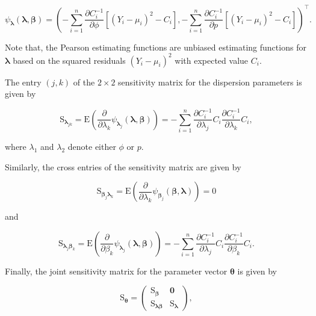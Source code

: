 \documentclass[9pt,a5paper,]{book}
\theoremstyle{definition}
\theoremstyle{definition}
\theoremstyle{remark}
\begin{document}
\begin{equation*}
\label{Pearson}
\psi_{\boldsymbol{\lambda}}(\boldsymbol{\lambda}, \boldsymbol{\beta}) = \left (-\sum_{i=1}^n \frac{\partial C^{-1}_i}{\partial \phi} \left [ (Y_i - \mu_i)^2 - C_i \right ], -\sum_{i=1}^n \frac{\partial C^{-1}_i}{\partial p}  \left [ (Y_i - \mu_i)^2 - C_i \right ]  \right )^\top.
\end{equation*}

Note that, the Pearson estimating functions are unbiased estimating
functions for \(\boldsymbol{\lambda}\) based on the squared residuals
\((Y_i - \mu_i)^2\) with expected value \(C_i\).

The entry \((j,k)\) of the \(2 \times 2\) sensitivity matrix for the
dispersion parameters is given by

\begin{equation}
\mathrm{S}_{\boldsymbol{\lambda}_{jk}} = \mathrm{E}\left ( \frac{\partial}{\partial \lambda_k}\psi_{\boldsymbol{\lambda}_j}(\boldsymbol{\lambda}, \boldsymbol{\beta})  \right ) = -\sum_{i=1}^n \frac{\partial C^{-1}_i}{\partial \lambda_j} C_i \frac{\partial C^{-1}_i}{\partial \lambda_k}C_i,
\label{eq:Slambda}
\end{equation}

where \(\lambda_1\) and \(\lambda_2\) denote either \(\phi\) or \(p\).

Similarly, the cross entries of the sensitivity matrix are given by

\begin{equation}
\mathrm{S}_{\boldsymbol{\beta}_j \boldsymbol{\lambda}_k} = \mathrm{E}\left ( \frac{\partial}{\partial \lambda_k}\psi_{\boldsymbol{\beta}_j}(\boldsymbol{\beta}, \boldsymbol{\lambda})  \right ) = 0
\label{eq:Sbetalambda}
\end{equation}

and

\begin{equation}
\mathrm{S}_{\boldsymbol{\lambda}_j \boldsymbol{\beta}_k} = \mathrm{E}\left ( \frac{\partial}{\partial \beta_k}\psi_{\boldsymbol{\lambda}_j}(\boldsymbol{\lambda}, \boldsymbol{\beta})  \right ) = -\sum_{i=1}^n \frac{\partial C_i^{-1}}{\partial \lambda_j} C_i \frac{\partial C_i^{-1}}{\partial \beta_k} C_i.
\label{eq:Slambdabeta}
\end{equation}

Finally, the joint sensitivity matrix for the parameter vector
\(\boldsymbol{\theta}\) is given by

\begin{equation*}
\mathrm{S}_{\boldsymbol{\theta}} = \begin{pmatrix}
\mathrm{S}_{\boldsymbol{\beta}} & \boldsymbol{0} \\
\mathrm{S}_{\boldsymbol{\lambda}\boldsymbol{\beta}} & \mathrm{S}_{\boldsymbol{\lambda}}
\end{pmatrix},
\end{equation*}
\end{document}
